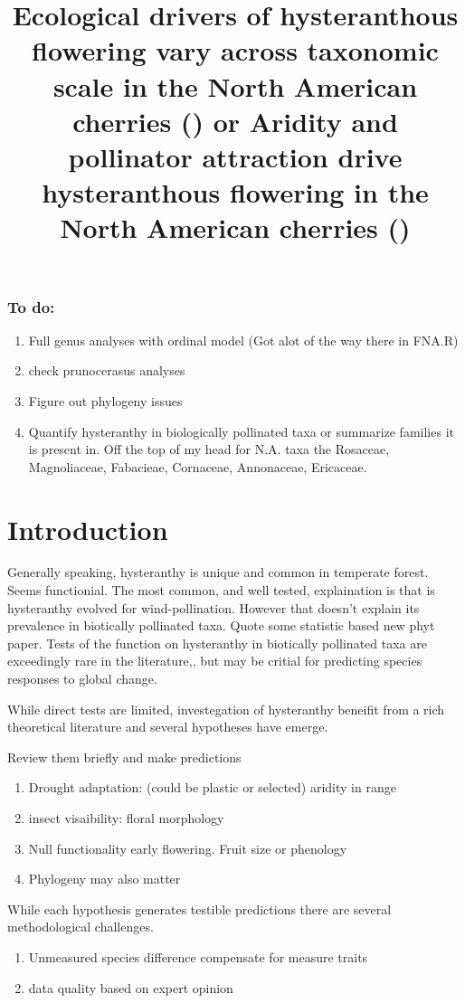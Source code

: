 \documentclass{article}\usepackage[]{graphicx}\usepackage[]{color}
\title{Ecological drivers of hysteranthous flowering vary across taxonomic scale in the North American cherries (\texit{Prunus spp.}) or
Aridity and pollinator attraction drive hysteranthous flowering in the North American cherries (\texit{Prunus spp.})}
\begin{document}
\maketitle

\subsubsection*{To do:}
\begin{enumerate}
\item Full genus analyses with ordinal model (Got alot of the way there in FNA.R)
\item check prunocerasus analyses
\item Figure out phylogeny issues
\item Quantify hysteranthy in biologically pollinated taxa or summarize families it is present in. Off the top of my head for N.A. taxa the Rosaceae, Magnoliaceae, Fabacieae, Cornaceae, Annonaceae, Ericaceae.
\end{enumerate}

\section*{Introduction}
Generally speaking, hysteranthy is unique and common in temperate forest. Seems functionial. The most common, and well tested, explaination is that is hysteranthy evolved for wind-pollination. However that doesn't explain its prevalence in biotically pollinated taxa. Quote some statistic based new phyt paper. Tests of the function on hysteranthy in biotically pollinated taxa are exceedingly rare in the literature,, but may be critial for predicting species responses to global change.

While direct tests are limited, investegation of hysteranthy beneifit from a rich theoretical literature and several hypotheses have emerge.

Review them briefly and make predictions
\begin{enumerate}
\item Drought adaptation: (could be plastic or selected) aridity in range
\item insect visaibility: floral morphology
\item Null functionality early flowering. Fruit size or phenology
\item Phylogeny may also matter
\end{enumerate}

While each hypothesis generates testible predictions there are several methodological challenges.
\begin{enumerate}
\item Unmeasured species difference compensate for measure traits
\item data quality based on expert opinion
\end{enumerate}
\end{document}
